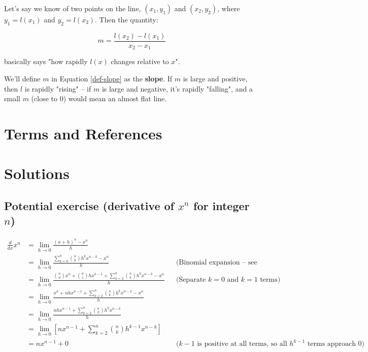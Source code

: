 Let's say we know of two points on the line, $(x_1, y_1)$ and $(x_2, y_2)$, where $y_1 = l(x_1)$ and $y_2 = l(x_2)$. Then the quantity:

\begin{equation}
\label{def-slope}
m = \frac{l(x_2) - l(x_1)}{x_2 - x_1}
\end{equation}

basically says "how rapidly $l(x)$ changes relative to $x$". 

We'll define $m$ in Equation \ref{def-slope} as the \textbf{slope}. If $m$ is large and positive, then $l$ is rapidly "rising" -- if $m$ is large and negative, it's rapidly "falling", and a small $m$ (close to 0) would mean an almost flat line.



\newpage
\section{Terms and References}

\section{Solutions}

\subsection{Potential exercise (derivative of $x^n$ for integer $n$)}

\begin{align*}
\frac{d}{dx}x^n &= \lim_{h \rightarrow 0} \frac{(x+h)^n - x^n}{h} \\
&= \lim_{h \rightarrow 0} \frac{\sum_{k=0}^n \binom{n}{k}h^k x^{n-k} - x^n}{h} && \text{(Binomial expansion -- see chapter)} \\
&= \lim_{h \rightarrow 0} \frac{\binom{n}{0}x^n + \binom{n}{1}hx^{n-1} + \sum_{k=2}^n \binom{n}{k}h^k x^{n-k} - x^n}{h} && \text{(Separate $k=0$ and $k=1$ terms)} \\
&= \lim_{h \rightarrow 0} \frac{x^n + nhx^{n-1} + \sum_{k=2}^n \binom{n}{k}h^k x^{n-k} - x^n}{h} \\
&= \lim_{h \rightarrow 0} \frac{nhx^{n-1} + \sum_{k=2}^n \binom{n}{k}h^k x^{n-k}}{h} \\
&= \lim_{h \rightarrow 0} \left[nx^{n-1} + \sum_{k=2}^n \binom{n}{k}h^{k-1} x^{n-k}\right] \\
&= nx^{n-1} + 0 && \text{($k-1$ is positive at all terms, so all $h^{k-1}$ terms approach 0)}\\
\end{align*}
